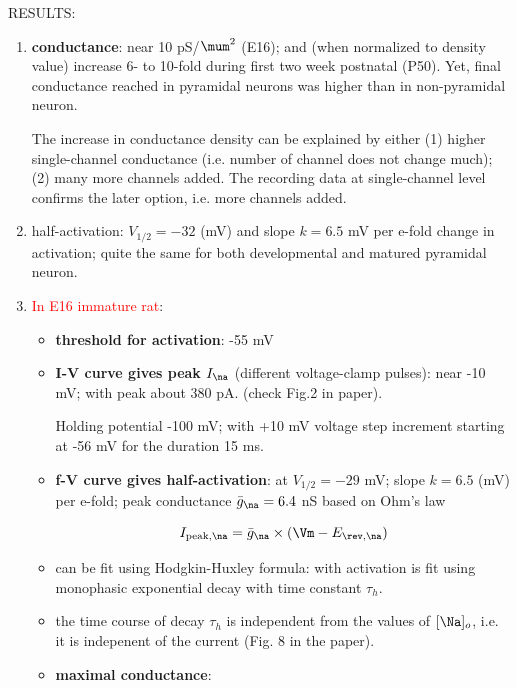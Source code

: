 RESULTS:
\begin{enumerate}
  
  \item {\bf conductance}: near 10 pS/$\mum^2$ (E16); and (when
  normalized to density value) increase 6- to 10-fold during first two week
  postnatal (P50). Yet, final conductance reached in pyramidal neurons was
  higher than in non-pyramidal neuron.
  
  The increase in conductance density can be explained by either
  (1) higher single-channel conductance (i.e. number of channel does not change
  much); (2) many more channels added. The recording data at single-channel
  level confirms the later option, i.e. more channels added.
  
  \item half-activation: $V_{1/2} = -32$ (mV) and slope $k = 6.5$ mV per e-fold
  change in activation; quite the same for both developmental and matured
  pyramidal neuron.
  
  
  \item \textcolor{red}{In E16 immature rat}:
  \begin{itemize}
  \item {\bf threshold for activation}: -55 mV
  
  \item {\bf I-V curve gives peak $I_\na$} (different voltage-clamp pulses):
  near -10 mV; with peak about 380 pA. (check Fig.2 in paper).
  
  Holding potential -100 mV; with +10 mV voltage step increment starting at -56
  mV for the duration 15 ms.

  \item {\bf f-V curve gives half-activation}: at $V_{1/2}=-29$ mV; slope
  $k=6.5$ (mV) per e-fold; peak conductance $\bar{g}_\na = 6.4$ nS based on
  Ohm's law 
  
  \begin{equation}
  I_{\text{peak},\na} = \bar{g}_\na \times (\Vm - E_{\rev,\na})
  \end{equation}
  
  \item can be fit using Hodgkin-Huxley formula: with activation is fit using
  monophasic exponential decay with time constant $\tau_h$.

  \item the time course of decay $\tau_h$ is independent from the values of
  $[\Na]_o$, i.e. it is indepenent of the current (Fig. 8 in the paper).
  
  \item {\bf maximal conductance}: 
  \end{itemize}
  

\end{enumerate}
